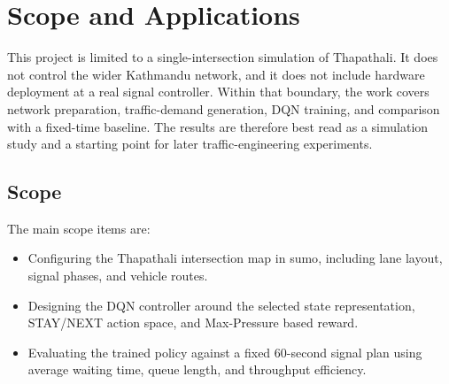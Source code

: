 \section{Scope and Applications}
\label{sec:scope_limitations}

This project is limited to a single-intersection simulation of
Thapathali. It does not control the wider Kathmandu network, and it does
not include hardware deployment at a real signal controller. Within that
boundary, the work covers network preparation, traffic-demand generation,
DQN training, and comparison with a fixed-time baseline. The results are
therefore best read as a simulation study and a starting point for later
traffic-engineering experiments.

\subsection{Scope}
\label{subsec:scope}

The main scope items are:

\begin{itemize}
    \item Configuring the Thapathali intersection map in \gls{sumo}, including lane layout, signal phases, and vehicle routes.
    \item Designing the DQN controller around the selected state representation, STAY/NEXT action space, and Max-Pressure based reward.
    \item Evaluating the trained policy against a fixed 60-second signal plan using average waiting time, queue length, and throughput efficiency.
\end{itemize}
